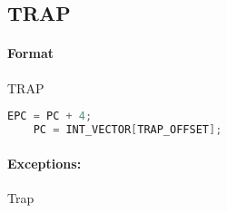 \subsection{TRAP}


\paragraph{Format} TRAP

\begin{lstlisting}[language=C]
    EPC = PC + 4;
    PC = INT_VECTOR[TRAP_OFFSET];
\end{lstlisting}

\paragraph{Exceptions:} Trap
